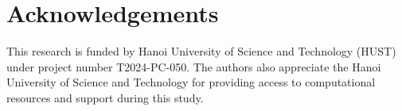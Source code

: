 \section*{Acknowledgements}
This research is funded by Hanoi University of Science and Technology (HUST) under project number T2024-PC-050. The authors also appreciate the Hanoi University of Science and Technology for providing access to computational resources and support during this study.